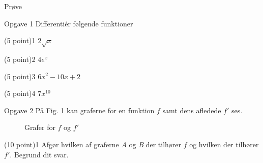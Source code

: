 
\begin{center}
\LARGE
Prøve
\end{center}
\begin{opgavetekst}{Opgave 1}
	Differentiér følgende funktioner
\end{opgavetekst}
	\begin{delopgave}{(5 point)}{1}
		$2\sqrt{x}$
	\end{delopgave}
	\begin{delopgave}{(5 point)}{2}
		$4e^x$
	\end{delopgave}
	\begin{delopgave}{(5 point)}{3}
		$6x^2-10x+2$
	\end{delopgave}
	\begin{delopgave}{(5 point)}{4}
		$7x^{10}$
	\end{delopgave}

\begin{opgavetekst}{Opgave 2}
	På Fig. \ref{fig:grafer} kan graferne for en funktion $f$ samt dens afledede $f'$ ses.

\begin{figure}[H]
		\centering
		\caption{Grafer for $f$ og $f'$}
		\label{fig:grafer}
\end{figure}
\phantom{h}
\end{opgavetekst}
\begin{delopgave}{(10 point)}{1}
	Afgør hvilken af graferne \textit{\color{teal} A} og \textit{\color{purple} B} der tilhører $f$ og hvilken der tilhører $f'$. 
	Begrund dit svar. 
\end{delopgave}

